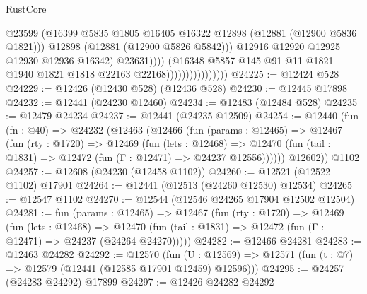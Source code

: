 \begin{lexlean}{RustCore}
\begin{coremodule}
                                              @23599
                                              (@16399
                                                @5835
                                                @1805
                                                @16405
                                                @16322
                                                @12898
                                                (@12881 (@12900 @5836 @1821)))
                                              @12898
                                              (@12881 (@12900 @5826 @5842)))
                                            @12916
                                            @12920
                                            @12925
                                            @12930
                                            @12936
                                            @16342)
                                          @23631))))
                                  (@16348
                                    @5857
                                    @145
                                    @91
                                    @11
                                    @1821
                                    @1940
                                    @1821
                                    @1818
                                    @22163
                                    @22168))))))))))))))))
@24225 := @12424 @528
@24229 := @12426 (@12430 @528) (@12436 @528)
@24230 := @12445 @17898
@24232 := @12441 (@24230 @12460)
@24234 := @12483 (@12484 @528)
@24235 := @12479 @24234
@24237 := @12441 (@24235 @12509)
@24254 := @12440
    (fun (fn : @40) =>
    @24232
      (@12463
        (@12466
          (fun (params : @12465) =>
          @12467
            (fun (rty : @1720) =>
            @12469
              (fun (lets : @12468) =>
              @12470 (fun (tail : @1831) => @12472 (fun (Γ : @12471) => @24237 @12556))))))
        @12602))
    @1102
@24257 := @12608 (@24230 (@12458 @1102))
@24260 := @12521 (@12522 @1102) @17901
@24264 := @12441 (@12513 (@24260 @12530) @12534)
@24265 := @12547 @1102
@24270 := @12544 (@12546 @24265 @17904 @12502 @12504)
@24281 := fun (params : @12465) =>
  @12467
    (fun (rty : @1720) =>
    @12469
      (fun (lets : @12468) =>
      @12470 (fun (tail : @1831) => @12472 (fun (Γ : @12471) => @24237 (@24264 @24270)))))
@24282 := @12466 @24281
@24283 := @12463 @24282
@24292 := @12570
    (fun (U : @12569) => @12571 (fun (t : @7) => @12579 (@12441 (@12585 @17901 @12459) @12596)))
@24295 := @24257 (@24283 @24292) @17899
@24297 := @12426 @24282 @24292

\end{coremodule}
\end{lexlean}
